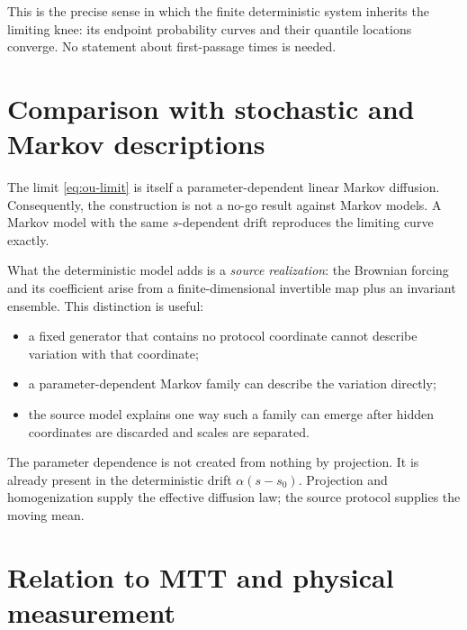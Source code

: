 \documentclass[11pt]{article}
\begin{document}
This is the precise sense in which the finite deterministic system inherits the limiting knee: its endpoint probability curves and their quantile locations converge. No statement about first-passage times is needed.

\section{Comparison with stochastic and Markov descriptions}

The limit \eqref{eq:ou-limit} is itself a parameter-dependent linear Markov diffusion. Consequently, the construction is not a no-go result against Markov models. A Markov model with the same \(s\)-dependent drift reproduces the limiting curve exactly.

What the deterministic model adds is a \emph{source realization}: the Brownian forcing and its coefficient arise from a finite-dimensional invertible map plus an invariant ensemble. This distinction is useful:
\begin{itemize}
\item a fixed generator that contains no protocol coordinate cannot describe variation with that coordinate;
\item a parameter-dependent Markov family can describe the variation directly;
\item the source model explains one way such a family can emerge after hidden coordinates are discarded and scales are separated.
\end{itemize}

The parameter dependence is not created from nothing by projection. It is already present in the deterministic drift
\(\alpha(s-s_0)\). Projection and homogenization supply the effective diffusion law; the source protocol supplies the moving mean.

\section{Relation to MTT and physical measurement}
\end{document}

